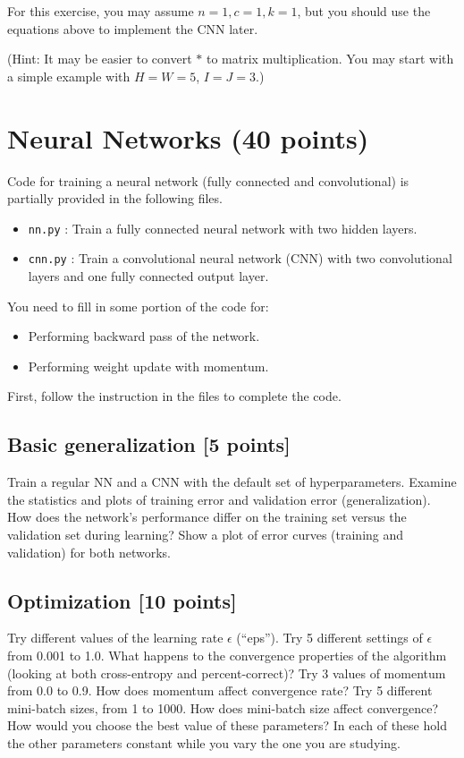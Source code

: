 \documentclass[12pt]{article}
\begin{document}
For this exercise, you may assume $n=1, c=1, k=1$, but you should use the 
equations above to implement the CNN later.

(Hint: It may be easier to convert $\ast$ to matrix multiplication. You may 
start with a simple example with $H=W=5$, $I=J=3$.)

\section{Neural Networks (40 points)}

Code for training a neural network (fully connected and convolutional) is
partially provided in the following files. 
\begin{itemize}
\item {\tt nn.py} : Train a fully connected neural network with two hidden 
layers.
\item {\tt cnn.py} : Train a convolutional neural network (CNN) with two 
convolutional layers and one fully connected output layer.
\end{itemize}

You need to fill in some portion of the code for:
\begin{itemize}
    \item Performing backward pass of the network.
    \item Performing weight update with momentum.
\end{itemize}

First, follow the instruction in the files to complete the code.

\subsection{Basic generalization [5 points]}

Train a regular NN and a CNN with the default set of hyperparameters.
Examine the statistics and plots of training error and validation error
(generalization). How does the network's performance differ on the training set
versus the validation set during learning? Show a plot of error curves
(training and validation) for both networks.

\subsection{Optimization [10 points]}

Try different values of the learning rate $\epsilon$ (``eps''). Try 5
different settings of $\epsilon$ from 0.001 to 1.0. What happens to the 
convergence properties of the algorithm (looking at both cross-entropy and 
percent-correct)? Try 3 values of momentum from 0.0 to 0.9. How does momentum affect 
convergence rate? Try 5 different mini-batch sizes, from 1 to 1000. How does 
mini-batch size affect convergence? How would you choose the best value of 
these parameters? In each of these hold the other parameters constant
while you vary the one you are studying.
\end{document}
